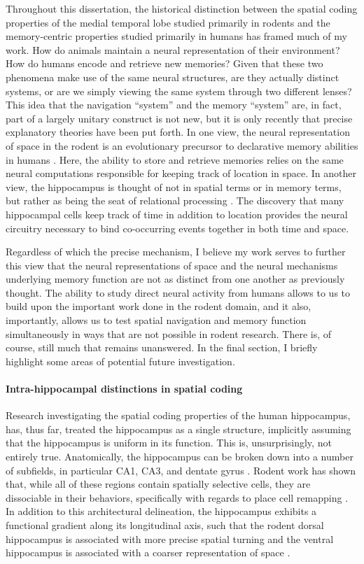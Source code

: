 Throughout this dissertation, the historical distinction between the spatial coding properties of the medial temporal lobe studied primarily in rodents and the memory-centric properties studied primarily in humans has framed much of my work. How do animals maintain a neural representation of their environment? How do humans encode and retrieve new memories? Given that these two phenomena make use of the same neural structures, are they actually distinct systems, or are we simply viewing the same system through two different lenses? This idea that the navigation ``system'' and the memory ``system'' are, in fact, part of a largely unitary construct is not new, but it is only recently that precise explanatory theories have been put forth. In one view, the neural representation of space in the rodent is an evolutionary precursor to declarative memory abilities in humans \citep{BuzsMose13}. Here, the ability to store and retrieve memories relies on the same neural computations responsible for keeping track of location in space. In another view, the hippocampus is thought of not in spatial terms or in memory terms, but rather as being the seat of relational processing \citep{CoheEich93,Eich14}. The discovery that many hippocampal cells keep track of time in addition to location \citep{MacDEtal11,PastEtal08} provides the neural circuitry necessary to bind co-occurring events together in both time and space.

Regardless of which the precise mechanism, I believe my work serves to further this view that the neural representations of space and the neural mechanisms underlying memory function are not as distinct from one another as previously thought. The ability to study direct neural activity from humans allows to us to build upon the important work done in the rodent domain, and it also, importantly, allows us to test spatial navigation and memory function simultaneously in ways that are not possible in rodent research. There is, of course, still much that remains unanswered. In the final section, I briefly highlight some areas of potential future investigation.

\paragraph{Intra-hippocampal distinctions in spatial coding}
Research investigating the spatial coding properties of the human hippocampus, has, thus far, treated the hippocampus as a single structure, implicitly assuming that the hippocampus is uniform in its function. This is, unsurprisingly, not entirely true. Anatomically, the hippocampus can be broken down into a number of subfields, in particular CA1, CA3, and dentate gyrus \citep{AndeEtal07}. Rodent work has shown that, while all of these regions contain spatially selective cells, they are dissociable in their behaviors, specifically with regards to place cell remapping \citep{LeutEtal04,LeutEtal05a,LeutEtal07}. In addition to this architectural delineation, the hippocampus exhibits a functional gradient along its longitudinal axis, such that the rodent dorsal hippocampus is associated with more precise spatial turning and the ventral hippocampus is associated with a coarser representation of space \citep{KjelEtal08,StraEtal14}.

